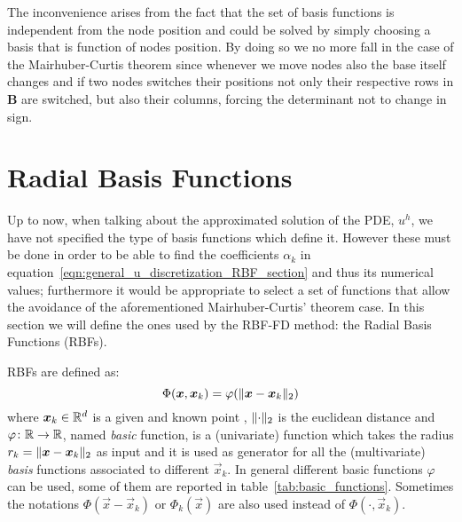 The inconvenience arises from the fact that the set of basis functions is independent from the node position and could be solved by simply choosing a basis that is function of nodes position. By doing so we no more fall in the case of the Mairhuber-Curtis theorem since whenever we move nodes also the base itself changes and if two nodes switches their positions not only their respective rows in $\boldsymbol{B}$ are switched, but also their columns, forcing the determinant not to change in sign.




\section{Radial Basis Functions} \label{subsec:radial_basis_functions}
Up to now, when talking about the approximated solution of the PDE, $u^h$, we have not specified the type of basis functions which define it. However these must be done in order to be able to find the coefficients $\alpha_k$ in equation~\eqref{eqn:general_u_discretization_RBF_section} and thus its numerical values; furthermore it would be appropriate to select a set of functions that allow the avoidance of the aforementioned Mairhuber-Curtis' theorem case. In this section we will define the ones used by the RBF-FD method: the Radial Basis Functions (RBFs).

RBFs are defined as:
\begin{equation}
	\label{eq:RBF_definition}
	\Phi(\boldsymbol{x}, \boldsymbol{x}_k) = \varphi(\lVert\boldsymbol{x} - \boldsymbol{x}_k\rVert_2)
\end{equation}
where $\boldsymbol{x}_k \in \mathbb{R}^d$ is a given and known point , $\lVert\cdot\rVert_2$ is the euclidean distance and $\varphi\colon \mathbb{R} \to \mathbb{R}$, named \emph{basic} function, is a (univariate) function which takes the radius $r_k = \lVert\boldsymbol{x} - \boldsymbol{x}_k\rVert_2$ as input and it is used as generator for all the (multivariate) \emph{basis} functions associated to different $\vec{x}_k$. In general different basic functions $\varphi$ can be used, some of them are reported in table~\ref{tab:basic_functions}. Sometimes the notations $\Phi(\vec{x} - \vec{x}_k)$ or $\Phi_k({\vec{x}})$ are also used instead of $\Phi(\cdot, \vec{x}_k)$.

